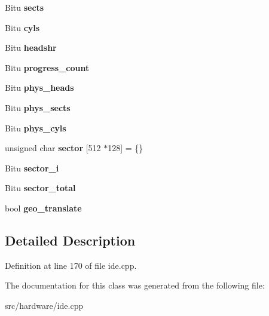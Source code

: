 \begin{DoxyCompactItemize}
\item 
\hypertarget{classIDEATADevice_a77463c48bf871a84d61a8b9bd1e95ffa}{Bitu {\bfseries sects}}\label{classIDEATADevice_a77463c48bf871a84d61a8b9bd1e95ffa}

\item 
\hypertarget{classIDEATADevice_a17435363559ff62f0d240f17f62c21cc}{Bitu {\bfseries cyls}}\label{classIDEATADevice_a17435363559ff62f0d240f17f62c21cc}

\item 
\hypertarget{classIDEATADevice_a907dbc2d9356cb6f98668573faf71242}{Bitu {\bfseries headshr}}\label{classIDEATADevice_a907dbc2d9356cb6f98668573faf71242}

\item 
\hypertarget{classIDEATADevice_a255e5d56bc9bf73d1cfdd542fd30126c}{Bitu {\bfseries progress\-\_\-count}}\label{classIDEATADevice_a255e5d56bc9bf73d1cfdd542fd30126c}

\item 
\hypertarget{classIDEATADevice_a917ccd0ef8076957499b62dd55a73377}{Bitu {\bfseries phys\-\_\-heads}}\label{classIDEATADevice_a917ccd0ef8076957499b62dd55a73377}

\item 
\hypertarget{classIDEATADevice_a15d352c5e1d3dcc12fc98b21c4ee3e40}{Bitu {\bfseries phys\-\_\-sects}}\label{classIDEATADevice_a15d352c5e1d3dcc12fc98b21c4ee3e40}

\item 
\hypertarget{classIDEATADevice_a99762c7f195dfffc524e3078b4a1e2bc}{Bitu {\bfseries phys\-\_\-cyls}}\label{classIDEATADevice_a99762c7f195dfffc524e3078b4a1e2bc}

\item 
\hypertarget{classIDEATADevice_aaf448a547054c85529e233d5381267d0}{unsigned char {\bfseries sector} \mbox{[}512 $\ast$128\mbox{]} = \{\}}\label{classIDEATADevice_aaf448a547054c85529e233d5381267d0}

\item 
\hypertarget{classIDEATADevice_a28e1aaa1f0f87336ee5fe12212bdfdf1}{Bitu {\bfseries sector\-\_\-i}}\label{classIDEATADevice_a28e1aaa1f0f87336ee5fe12212bdfdf1}

\item 
\hypertarget{classIDEATADevice_a1eda9b2179b67dca4f5c850bff4a2c4c}{Bitu {\bfseries sector\-\_\-total}}\label{classIDEATADevice_a1eda9b2179b67dca4f5c850bff4a2c4c}

\item 
\hypertarget{classIDEATADevice_a85149993bb50733c34f92c123d6addec}{bool {\bfseries geo\-\_\-translate}}\label{classIDEATADevice_a85149993bb50733c34f92c123d6addec}

\end{DoxyCompactItemize}


\subsection{Detailed Description}


Definition at line 170 of file ide.\-cpp.



The documentation for this class was generated from the following file\-:\begin{DoxyCompactItemize}
\item 
src/hardware/ide.\-cpp\end{DoxyCompactItemize}
